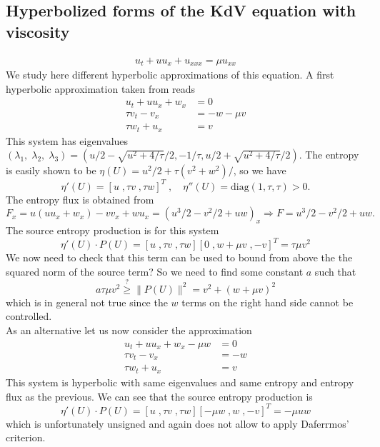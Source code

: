 \documentclass{article}
\theoremstyle{plain}
\theoremstyle{definition}
\numberwithin{theorem}{section}
\begin{document}
\subsection{Hyperbolized forms of the KdV equation with viscosity}

\begin{align}
    u_t + u u_x + u_{xxx} = \mu u_{xx}
\end{align}
We study here different hyperbolic approximations of this equation.
A first  hyperbolic approximation taken from \cite{giesselmann2025convergence} reads
\begin{subequations} \label{vkdvh1}
\begin{align}
    u_t + u u_x  + w_x & = 0 \\
    \tau v_t   - v_x  & = -w -\mu v\\
        \tau w_t +  u_x & = v
\end{align}
\end{subequations}
This system has eigenvalues $(\lambda_1,\; \lambda_2,\;\lambda_3)=(u/2 - \sqrt{u^2+4/\tau}/2, -1/\tau, u/2+ \sqrt{u^2+4/\tau}/2)$.
The entropy is easily shown to be $\eta(U) = u^2/2 + \tau (v^2+w^2)/$, so we have
$$
\eta'(U)= [u\;, \tau v\;, \tau w]^T\;,\quad
\eta''(U) =  \text{diag}(1,\tau,\tau) >0.
$$
The entropy flux is obtained from
$$
F_x =u (u u_x  + w_x) - v v_x + wu_x = ( u^3/2 - v^2/2  + uw )_x\Rightarrow F = u^3/2 - v^2/2  + uw.
$$
The source entropy production is for this system
$$
\eta'(U)\cdot P(U) = [u\;, \tau v\;, \tau w] [0\;, w +\mu v\;, -v]^T = \tau \mu v^2  
$$
We now need to check that this term can be used to bound from above the the squared norm of the source term?
So we need to find some constant $a$ such that
$$
  a \tau \mu   v^2 \stackrel{?}{\ge} \|P(U)\|^2 = v^2 + (w +\mu v)^2
$$
which is in general not true since the $w$ terms on the right hand side cannot be controlled.\\



As an alternative let us now consider the approximation
\begin{subequations} \label{vkdvh2}
\begin{align}
    u_t + u u_x  + w_x -\mu w & = 0 \\
    \tau v_t - v_x & = -w\\
        \tau w_t +  u_x & = v
\end{align}
\end{subequations}
This system is hyperbolic with  same eigenvalues  and same entropy and entropy flux as the previous.
We can see that  the source entropy production is
$$
\eta'(U)\cdot P(U) = [u\;, \tau v\;, \tau w] [-\mu w\;, w\;, -v]^T =- \mu u w
$$
which is unfortunately unsigned and again does not allow to apply Daferrmos' criterion.\\
\end{document}
